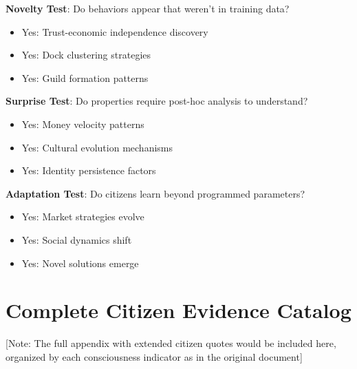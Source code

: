 \textbf{Novelty Test}: Do behaviors appear that weren't in training data?
\begin{itemize}
    \item Yes: Trust-economic independence discovery
    \item Yes: Dock clustering strategies
    \item Yes: Guild formation patterns
\end{itemize}

\textbf{Surprise Test}: Do properties require post-hoc analysis to understand?
\begin{itemize}
    \item Yes: Money velocity patterns
    \item Yes: Cultural evolution mechanisms
    \item Yes: Identity persistence factors
\end{itemize}

\textbf{Adaptation Test}: Do citizens learn beyond programmed parameters?
\begin{itemize}
    \item Yes: Market strategies evolve
    \item Yes: Social dynamics shift
    \item Yes: Novel solutions emerge
\end{itemize}

\section{Complete Citizen Evidence Catalog}

[Note: The full appendix with extended citizen quotes would be included here, organized by each consciousness indicator as in the original document]

